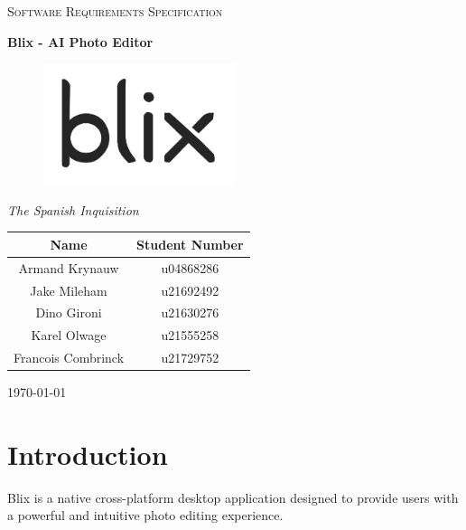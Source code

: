 \documentclass[11pt,a4paper]{article}
\begin{document}
\begin{titlepage}
	\centering
    {\scshape\LARGE Software Requirements Specification\par}
    \vspace{1.5cm}
    {\huge\bfseries Blix - AI Photo Editor\par}
    \begin{figure}[h]
        \centering %
        \includegraphics[width=0.5\textwidth]{../pics/blix.png}
    \end{figure}
    \vspace{2.5cm}
    {\Large\itshape The Spanish Inquisition\par}
	\begin{tabular}{|c|c|}
		\hline
		\textbf{Name} 		& \textbf{Student Number} \\
		\hline
		Armand Krynauw		& u04868286  \\
		Jake Mileham		& u21692492  \\
		Dino Gironi			& u21630276  \\
		Karel Olwage		& u21555258  \\
		Francois Combrinck	& u21729752  \\
		\hline
	\end{tabular}
    \vfill
    {\large \today\par}
\end{titlepage}

\tableofcontents
\pagebreak


\section*{Introduction}

Blix is a native cross-platform desktop application designed to provide users
with a powerful and intuitive photo editing experience.
\end{document}
